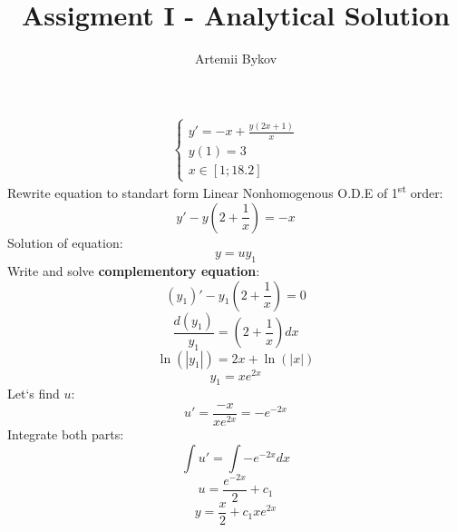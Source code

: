 \documentclass{article}
\title{Assigment I - Analytical Solution}
\author{Artemii Bykov }
\date{}
\begin{document}
    
    \maketitle
    \centering
    \thispagestyle{empty}

    \[
        \left\{
            \begin{array}{c}
            y'=-x + \frac{y(2x+1)}{x}  \\ 
            y(1)=3 \\
             x\in[1;18.2]
        \end{array}
        \right.
    \]
    Rewrite equation to standart form  Linear Nonhomogenous O.D.E of 1\textsuperscript{st} order: 
    \[y'-y(2+\frac{1}{x})=-x\]
    Solution of equation: \[y=uy_{1}\]
    Write and solve \textbf{complementory equation}:
    \[(y_{1})'-y_{1}(2+\frac{1}{x})=0 \]
    \[\frac{d(y_{1})}{y_{1}}=(2+\frac{1}{x})dx\]
    \[\ln(|y_{1}|)=2x+\ln(|x|)\]
    \[y_{1}=xe^{2x}\]
    Let`s find \ensuremath{u}:
    \[u' = \frac{-x}{xe^{2x}}=-e^{-2x}\]
    Integrate both parts:
    \[\int u'=\int -e^{-2x}dx\]
    \[u = \frac{e^{-2x}}{2}+c_1\]
    \[y=\frac{x}{2}+c_1xe^{2x}\]

    
\end{document}
